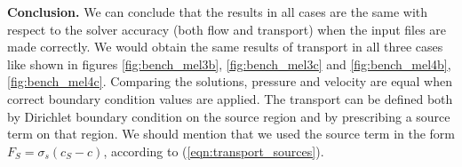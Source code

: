 \vfil

\textbf{Conclusion.} We can conclude that the results in all cases are the same with respect to the solver accuracy (both flow and transport) when 
the input files are made correctly. We would obtain the same results of transport in all three cases like shown in figures \ref{fig:bench_mel3b}, \ref{fig:bench_mel3c} and 
\ref{fig:bench_mel4b}, \ref{fig:bench_mel4c}. Comparing the solutions, pressure and velocity are equal when correct boundary condition values are applied. 
The transport can be defined both by Dirichlet boundary condition on the source region and by prescribing a source term on that region. 
We should mention that we used the source term in the form $F_S = \sigma_s(c_S-c)$, according to (\ref{eqn:transport_sources}).

\pagebreak

